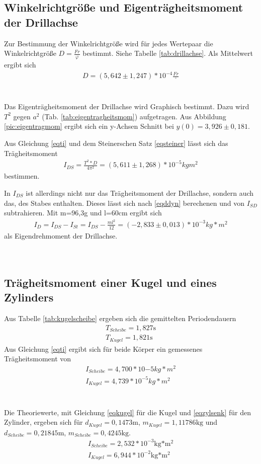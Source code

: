\subsection{Winkelrichtgröße und Eigenträgheitsmoment der Drillachse}

Zur Bestimmung der Winkelrichtgröße wird für jedes Wertepaar die Winkelrichtgröße $D=\frac{Fr}{\varphi}$ bestimmt. Siehe Tabelle \ref{tab:drillachse}. Als Mittelwert ergibt sich
\begin{align}
D=(5,642\pm1,247)*10^{-4}\frac{Fr}{^{\circ}}
\end{align}
\\
\\


Das Eigenträgheitsmoment der Drillachse wird Graphisch bestimmt. Dazu wird $T^2$ gegen $a^2$ (Tab. \ref{tab:eigentragheitsmom}) aufgetragen. 
Aus Abbildung \ref{pic:eigentragmom} ergibt sich ein y-Achsen Schnitt bei $y(0)=3,926\pm 0,181$.


Aus Gleichung \ref{eqti} und dem Steinerschen Satz \ref{eqsteiner} lässt sich das Trägheitsmoment 
\begin{align}
I_{DS}=\frac{T^2*D}{4\pi^2}=(5,611\pm1,268)*10^{-5}kgm^2
\end{align}
bestimmen.

In $I_{DS}$ ist allerdings nicht nur das Trägheitsmoment der Drillachse, sondern auch das, des Stabes enthalten. Dieses lässt sich nach \ref{eqddyn} berechenen und von $I_{SD}$ subtrahieren. Mit m=96,3g und l=60cm ergibt sich
\begin{align}
I_{D}=I_{DS}-I_{St}=I_{DS}-\frac{ml^2}{12}=(-2,833\pm 0,013)*10^{-3}kg*m^2
\end{align}
als Eigendrehmoment der Drillachse.
\\
\\
\\
\subsection{Trägheitsmoment einer Kugel und eines Zylinders}

Aus Tabelle \ref{tab:kugelscheibe} ergeben sich die gemittelten Periodendauern
\begin{align*}
T_{Scheibe}=1,827\text{s}\\
T_{Kugel}=1,821\text{s}
\end{align*}
Aus Gleichung \ref{eqti} ergibt sich für beide Körper ein gemessenes Trägheitsmoment von
\begin{align}
I_{Scheibe}=4,700*10{-5}kg*m^2\\
I_{Kugel}=4,739*10^{-5}kg*m^2
\end{align}
\\
\\
Die Theoriewerte, mit Gleichung \ref{eqkugel} für die Kugel und \ref{eqzylsenk} für den Zylinder, ergeben sich für $d_{Kugel}= 0,1473\text{m}$, $m_{Kugel}=1,11786\text{kg}$ und $d_{Scheibe}=0,21845\text{m}$, $m_{Scheibe}=0,4245\text{kg}$.
\begin{align*}
I_{Scheibe}=2,532*10^{-3}\text{kg*m$^2$}\\
I_{Kugel}=6,944*10^{-2}\text{kg*m$^2$}
\end{align*}
\\
\\
\\
